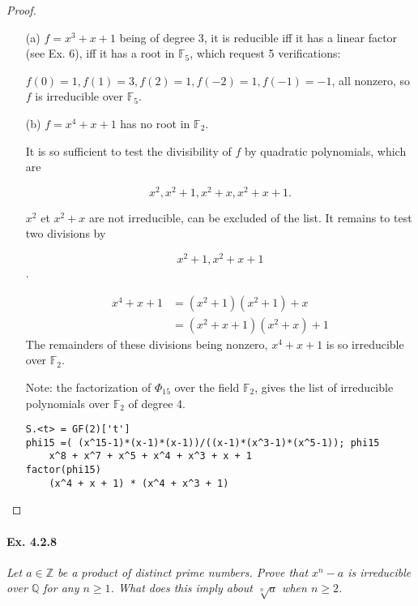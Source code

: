 \documentclass[11pt,a4paper]{article}
\newcommand{\Q}{\mathbb{Q}}
\newcommand{\Z}{\mathbb{Z}}
\newcommand{\F}{\mathbb{F}}
\begin{document}
\begin{proof}

\begin{enumerate}
\item[(a)]
$f= x^3+x+1$ being of degree 3, it is reducible iff it has a linear factor (see Ex. 6), iff  it has a root in $\mathbb{F}_5$, which request 5 verifications:

$f(0)=1, f(1)=3, f(2)=1, f(-2) = 1, f(-1) = -1$, all nonzero, so $f$ is irreducible over $\F_5$.

\item[(b)]
$f = x^4+x+1$ has no root in  $\F_2$.

It is so sufficient to test the divisibility of $f$ by quadratic polynomials, which are

$$x^2,x^2+1, x^2+x, x^2+x+1.$$

$x^2$ et $x^2+x$ are not irreducible, can be excluded of the list. It remains to test two divisions by

$$x^2+1,x^2+x+1$$.

\begin{align*}
x^4+x+1 &= (x^2+1)(x^2+1)+x\\
&=(x^2+x+1)(x^2+x)+1
\end{align*}
The remainders of these divisions being nonzero, $x^4+x+1$ is so irreducible over $\mathbb{F}_2$.

Note: the factorization of $\Phi_{15}$ over the field $\mathbb{F}_2$, gives the list of irreducible polynomials over $\mathbb{F}_2$ of degree 4.
\begin{verbatim}
S.<t> = GF(2)['t']
phi15 =( (x^15-1)*(x-1)*(x-1))/((x-1)*(x^3-1)*(x^5-1)); phi15
	x^8 + x^7 + x^5 + x^4 + x^3 + x + 1
factor(phi15)
	(x^4 + x + 1) * (x^4 + x^3 + 1)
\end{verbatim}
\end{enumerate}
\end{proof}

\paragraph{Ex. 4.2.8}

{\it Let $a\in \Z$ be a product of distinct prime numbers. Prove that $x^n-a$ is irreducible over $\Q$ for any $n\geq 1$. What does this imply about $\sqrt[n]{a}$ when $n\geq 2$.
}
\end{document}
